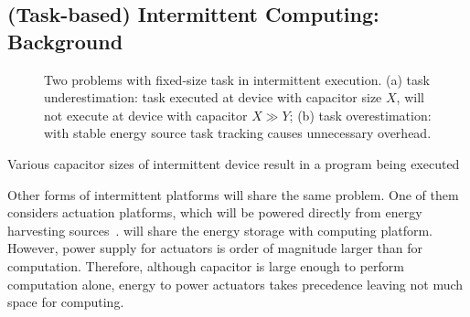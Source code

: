 \subsection{(Task-based) Intermittent Computing: Background}

\begin{figure}
	\centering
	\caption{Two problems with fixed-size task in intermittent execution. (a) task underestimation: task executed at device with capacitor size $X$, will not execute at device with capacitor $X\gg Y$; (b) task overestimation: with stable energy source task tracking causes unnecessary overhead.}
	\label{fig:fixed_task_problem}
\end{figure}

Various capacitor sizes of intermittent device result in a program being executed 



Other forms of intermittent platforms will share the same problem. One of them considers actuation platforms, which will be powered directly from energy harvesting sources~\cite{}. will share the energy storage with computing platform. However, power supply for actuators is order of magnitude larger than for computation. Therefore, although capacitor is large enough to perform computation alone, energy to power actuators takes precedence leaving not much space for computing.


